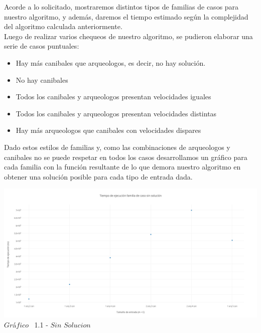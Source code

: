 \indent Acorde a lo solicitado, mostraremos distintos tipos de familias de casos para nuestro algoritmo, y adem\'as, daremos el tiempo estimado 
seg\'un la complejidad del algoritmo calculada anteriormente.\\

Luego de realizar varios chequeos de nuestro algoritmo, se pudieron elaborar una serie de casos puntuales:

\begin{itemize}
\item Hay m\'as canibales que arqueologos, es decir, no hay soluci\'on.
\item No hay canibales
\item Todos los canibales y arqueologos presentan velocidades iguales
\item Todos los canibales y arqueologos presentan velocidades distintas
\item Hay m\'as arqueologos que canibales con velocidades dispares
\end{itemize}

Dado estos estilos de familias y, como las combinaciones de arqueologos y canibales no se puede respetar en todos los casos desarrollamos un gr\'afico para cada familia con la funci\'on resultante de lo que demora nuestro algoritmo en obtener una soluci\'on posible para cada tipo de entrada dada.

\vspace*{0.3cm} \vspace*{0.3cm}
  \begin{center}
 \includegraphics[scale=0.45]{./EJ1/sinsolucion.png}
 {$Gr$\'a$fico$ \ 1.1 - $Sin$ $Solucion$}
  \end{center}
  \vspace*{0.3cm}
 

